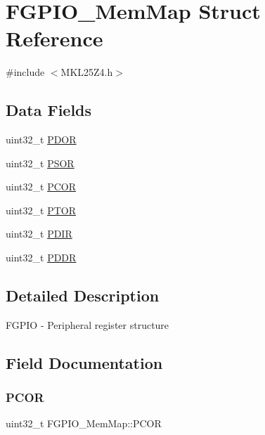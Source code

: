 \hypertarget{struct_f_g_p_i_o___mem_map}{}\section{F\+G\+P\+I\+O\+\_\+\+Mem\+Map Struct Reference}
\label{struct_f_g_p_i_o___mem_map}


{\ttfamily \#include $<$M\+K\+L25\+Z4.\+h$>$}

\subsection*{Data Fields}
\begin{DoxyCompactItemize}
\item 
uint32\+\_\+t \hyperlink{struct_f_g_p_i_o___mem_map_ab549d3ecd17467804bc780c97f83e034}{P\+D\+OR}
\item 
uint32\+\_\+t \hyperlink{struct_f_g_p_i_o___mem_map_a7179b85bd4a68dc196cb91b6433dd674}{P\+S\+OR}
\item 
uint32\+\_\+t \hyperlink{struct_f_g_p_i_o___mem_map_a3b37c7b24e8edd80c1cbc5282a4a8a3c}{P\+C\+OR}
\item 
uint32\+\_\+t \hyperlink{struct_f_g_p_i_o___mem_map_aa07e31d4362b7c29a10592d24511198c}{P\+T\+OR}
\item 
uint32\+\_\+t \hyperlink{struct_f_g_p_i_o___mem_map_af869762f9d42637f8fc09354e8947834}{P\+D\+IR}
\item 
uint32\+\_\+t \hyperlink{struct_f_g_p_i_o___mem_map_add5e56027e27e8a0076bf1c38fdcaed5}{P\+D\+DR}
\end{DoxyCompactItemize}


\subsection{Detailed Description}
F\+G\+P\+IO -\/ Peripheral register structure 

\subsection{Field Documentation}
\mbox{\label{struct_f_g_p_i_o___mem_map_a3b37c7b24e8edd80c1cbc5282a4a8a3c}} 
\subsubsection{\texorpdfstring{P\+C\+OR}{PCOR}}
{\footnotesize\ttfamily uint32\+\_\+t F\+G\+P\+I\+O\+\_\+\+Mem\+Map\+::\+P\+C\+OR}

